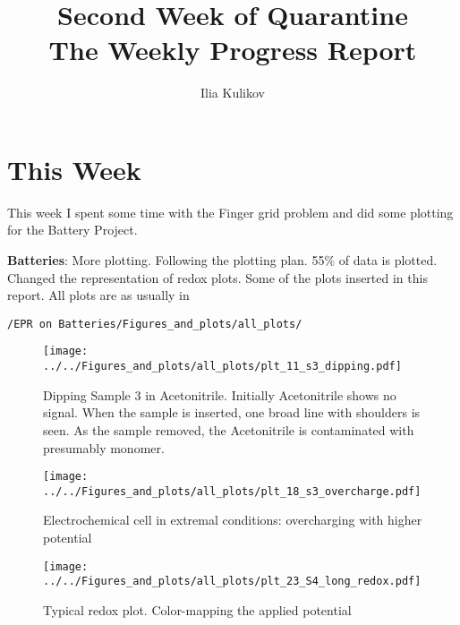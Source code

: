 \documentclass[12pt,a4paper]{report}
\begin{document}
\title{%
  Second Week of Quarantine\\
  \large The Weekly Progress Report \\
    }

\author{Ilia Kulikov}


\setcounter{chapter}{+1}
\maketitle

\section{This Week}
This week I spent some time with the Finger grid problem and did some plotting for the Battery Project.\\
\par \textbf{Batteries}: More plotting. Following the plotting plan. 55\% of data is plotted. Changed the representation of redox plots. Some of the plots inserted in this report. All plots are as usually in 
\begin{verbatim}/EPR on Batteries/Figures_and_plots/all_plots/
\end{verbatim}

\begin{figure} [!ht]

\begin{center}
       \texttt{[image: ../../Figures\_and\_plots/all\_plots/plt\_11\_s3\_dipping.pdf]}
       \end{center}
\caption{Dipping Sample 3 in Acetonitrile. Initially Acetonitrile shows no signal. When the sample is inserted, one broad line with shoulders is seen. As the sample removed, the Acetonitrile is contaminated with presumably monomer.}
     \label{fig:dipping}
\end{figure}

\begin{figure} [!ht]

\begin{center}
       \texttt{[image: ../../Figures\_and\_plots/all\_plots/plt\_18\_s3\_overcharge.pdf]}
       \end{center}
\caption{Electrochemical cell in extremal conditions: overcharging with higher potential}
     \label{fig:overcharge}
\end{figure}

\begin{figure} [!ht]
\begin{center}
       \texttt{[image: ../../Figures\_and\_plots/all\_plots/plt\_23\_S4\_long\_redox.pdf]}
       \end{center}
\caption{Typical redox plot. Color-mapping the applied potential}
     \label{fig:long_redox}
\end{figure}
\end{document}
